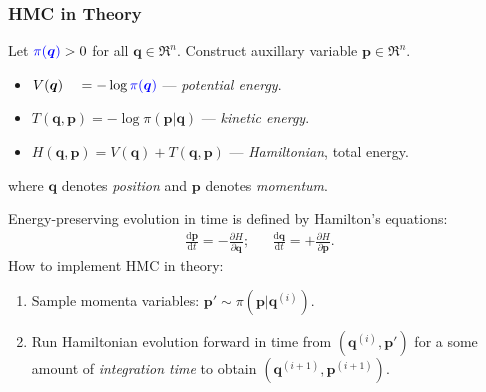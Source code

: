 \documentclass[xcolor=dvipsnames]{beamer}
\begin{document}
\begin{frame}
\frametitle{HMC in Theory}
Let ${\color{blue}\pi(\bm{q})}>0$ for all ${\bm{q}}\in\Re^n$. Construct auxillary variable $\bm{p}\in\Re^n$.
\begin{itemize}
\item[] $V({\bm{q}})\phantom{,\bm{p}} = -\log {\color{blue}\pi(\bm{q})}$ --- \emph{potential energy}.
\item[] $T({\bm{q}}, \bm{p}) = - \log \pi(\bm{p} | {\bm{q}})$ --- \emph{kinetic energy}.
\item[] $H({\bm{q}}, \bm{p}) = V({\bm{q}}) + T({\bm{q}}, \bm{p})$ --- \emph{Hamiltonian}, total energy.
\end{itemize}
where ${\bm{q}}$ denotes {\color{red}\emph{position}} and $\bm{p}$ denotes {\color{red}\emph{momentum}}.

\vspace{0.3cm}

Energy-preserving evolution in time is defined by Hamilton's equations:
\begin{align*}
\frac{\mathrm{d}\bm{p}}{\mathrm{d} t} = - \frac{\partial H}{\partial {\bm{q}}}; && \frac{\mathrm{d}{\bm{q}}}{\mathrm{d} t} = + \frac{\partial H}{\partial \bm{p}}.
\end{align*}
How to implement HMC in theory:
\begin{enumerate}
\item Sample momenta variables: $\bm{p}' \sim \pi(\bm{p}|\bm{q}^{(i)})$.
\item Run Hamiltonian evolution forward in time from $(\bm{q}^{(i)}, \bm{p}')$ for a some amount of {\color{red}\emph{integration time}} to obtain $(\bm{q}^{(i+1)}, \bm{p}^{(i+1)})$.
\end{enumerate}
\end{frame}
\end{document}
